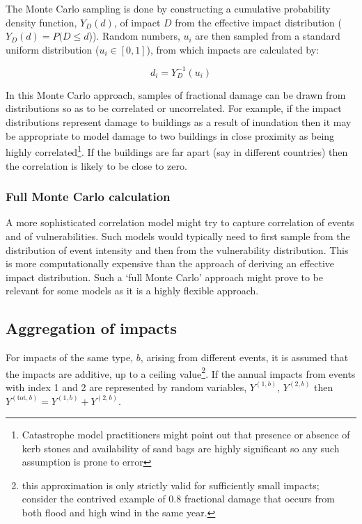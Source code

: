 \documentclass[a4paper,11pt]{extarticle} %
\begin{document}
{The Monte Carlo sampling is done by constructing a cumulative probability density function, $Y_D(d)$, of impact $D$ from the effective impact distribution ($Y_D(d) = P(D \le d$)). Random numbers, $u_i$ are then sampled from a standard uniform distribution ($u_i \in [0, 1]$), from which impacts are calculated by:

\begin{equation}
    \label{Eq:sampling}
    d_i = Y^{-1}_D(u_i)
\end{equation}

In this Monte Carlo approach, samples of fractional damage can be drawn from distributions so as to be correlated or uncorrelated. For example, if the impact distributions represent damage to buildings as a result of inundation then it may be appropriate to model damage to two buildings in close proximity as being highly correlated\footnote{Catastrophe model practitioners might point out that presence or absence of kerb stones and availability of sand bags are highly significant so any such assumption is prone to error}. If the buildings are far apart (say in different countries) then the correlation is likely to be close to zero.

\subsubsection{Full Monte Carlo calculation}
A more sophisticated correlation model might try to capture correlation of events and of vulnerabilities. Such models would typically need to first sample from the distribution of event intensity and then from the vulnerability distribution. This is more computationally expensive than the approach of deriving an effective impact distribution. Such a `full Monte Carlo' approach might prove to be relevant for some models as it is a highly flexible approach.


\subsection{Aggregation of impacts}
For impacts of the same type, $b$, arising from different events, it is assumed that the impacts are additive, up to a ceiling value\footnote{this approximation is only strictly valid for sufficiently small impacts; consider the contrived example of 0.8 fractional damage that occurs from both flood and high wind in the same year.}. If the annual impacts from events with index 1 and 2 are represented by random variables, $Y^{(1,b)}$, $Y^{(2,b)}$ then $Y^{(\text{tot}, b)} = Y^{(1,b)} + Y^{(2,b)}$.

}
\end{document}
